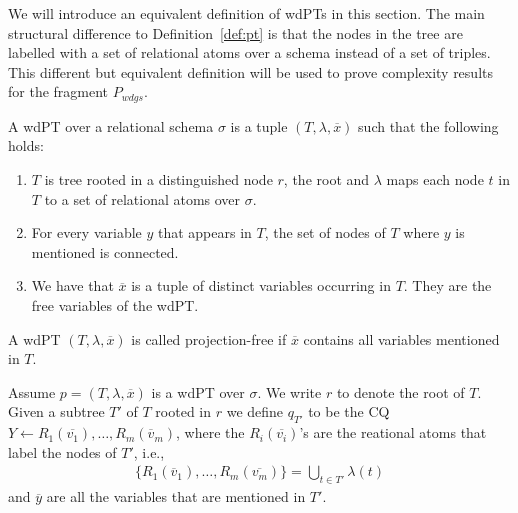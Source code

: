 We will introduce an equivalent definition of wdPTs in this section. The
main structural difference to Definition~\ref{def:pt} is that the nodes in the
tree are labelled with a set of relational atoms over a schema instead of a set of triples. This different but
equivalent definition will be used to prove complexity results for the fragment
$P_{wdgs}$. 

\begin{definition}\label{def:wdpt}
	A wdPT over a relational schema $\sigma$ is a tuple $(T, \lambda, \overline{x})$
	such that the following holds:
	\begin{enumerate}
		\item $T$ is tree rooted in a distinguished node $r$, the root and $\lambda$
			maps each node $t$ in $T$ to a set of relational atoms over $\sigma$.
		\item For every variable $y$ that appears in $T$, the set of nodes of $T$ where
			$y$ is mentioned is connected.
		\item We have that $\overline{x}$ is a tuple of distinct variables occurring in
			$T$. They are the free variables of the wdPT.
	\end{enumerate}
\end{definition}

\begin{definition}
	A wdPT $(T,\lambda, \overline{x})$ is called projection-free if $\overline{x}$
	contains all variables mentioned in $T$.
\end{definition}

\begin{definition}\label{wdptq}
	Assume $p = (T,\lambda,\overline{x})$ is a wdPT over $\sigma$. We write $r$ to
	denote the root of $T$. Given a subtree $T'$ of $T$ rooted in $r$ we define
	$q_{T'}$ to be the CQ $Y \leftarrow R_1(\overline{v_1}), \dots,
	R_m(\overline{v}_m)$, where the $R_i(\overline{v_i})$'s are the reational atoms
	that label the nodes of $T'$, i.e., 
	\begin{align*}
		\{ R_1(\overline{v}_1), \dots, R_m(\overline{v_m}) \} = \bigcup_{t \in T'} \lambda(t) 
	\end{align*} and $\overline{y}$ are all the variables that are mentioned in
	$T'$. 
\end{definition}

